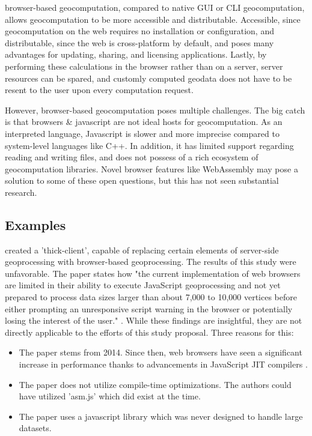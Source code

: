 browser-based geocomputation, compared to native GUI or CLI geocomputation, allows geocomputation to be more accessible and distributable. 
Accessible, since geocomputation on the web requires no installation or configuration, 
and distributable, since the web is cross-platform by default, and poses many advantages for updating, sharing, and licensing applications. 
Lastly, by performing these calculations in the browser rather than on a server, server resources can be spared, 
and customly computed geodata does not have to be resent to the user upon every computation request.

However, browser-based geocomputation poses multiple challenges. 
The big catch is that browsers \& javascript are not ideal hosts for geocomputation. 
As an interpreted language, Javascript is slower and more imprecise compared to system-level languages like C++.
In addition, it has limited support regarding reading and writing files, and does not possess of a rich ecosystem of geocomputation libraries.  
Novel browser features like WebAssembly may pose a solution to some of these open questions, but this has not seen substantial research. 

\subsection{Examples}

\citet{hamilton_client-side_2014} created a 'thick-client', capable of replacing certain elements of server-side geoprocessing with browser-based geoprocessing. 
The results of this study were unfavorable. 
The paper states how "the current implementation of web browsers are limited in their ability to execute JavaScript geoprocessing and not yet prepared to process data sizes larger than about 7,000 to 10,000 vertices before either prompting an unresponsive script warning in the browser or potentially losing the interest of the user." \citep{hamilton_client-side_2014}. 
While these findings are insightful, they are not directly applicable to the efforts of this study proposal. Three reasons for this:

\begin{itemize}
  \item The paper stems from 2014. Since then, web browsers have seen a significant increase in performance thanks to advancements in JavaScript JIT compilers \citep{haas_bringing_2017, kulawiak_analysis_2019}. 
  \item The paper does not utilize compile-time optimizations. The authors could have utilized 'asm.js' \citep{mozilla_asmjs_2013} which did exist at the time. 
  \item The paper uses a javascript library which was never designed to handle large datasets.
\end{itemize}

